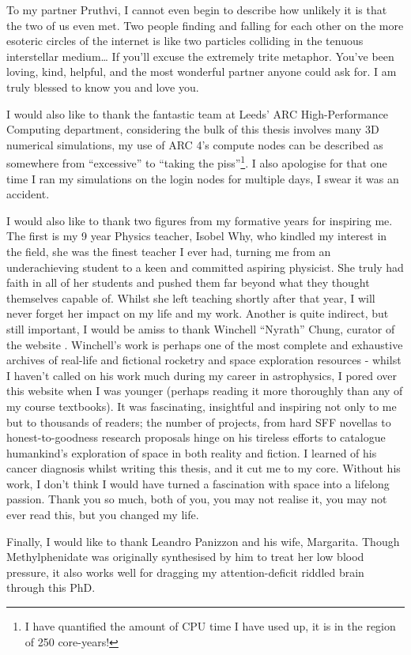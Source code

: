 \begin{acknowledgements}
To my partner Pruthvi, I cannot even begin to describe how unlikely it is that the two of us even met.
Two people finding and falling for each other on the more esoteric circles of the internet is like two particles colliding in the tenuous interstellar medium\ldots{}
If you'll excuse the extremely trite metaphor.
You've been loving, kind, helpful, and the most wonderful partner anyone could ask for.
I am truly blessed to know you and love you.

I would also like to thank the fantastic team at Leeds' ARC High-Performance Computing department, considering the bulk of this thesis involves many 3D numerical simulations, my use of ARC 4's compute nodes can be described as somewhere from ``excessive'' to ``taking the piss''\footnote{I have quantified the amount of CPU time I have used up, it is in the region of 250 core-years!}.
I also apologise for that one time I ran my simulations on the login nodes for multiple days, I swear it was an accident.

I would also like to thank two figures from my formative years for inspiring me.
The first is my 9 year Physics teacher, Isobel Why, who kindled my interest in the field, she was the finest teacher I ever had, turning me from an underachieving student to a keen and committed aspiring physicist.
She truly had faith in all of her students and pushed them far beyond what they thought themselves capable of.
Whilst she left teaching shortly after that year, I will never forget her impact on my life and my work.
Another is quite indirect, but still important, I would be amiss to thank Winchell ``Nyrath'' Chung, curator of the website .
Winchell's work is perhaps one of the most complete and exhaustive archives of real-life and fictional rocketry and space exploration resources - whilst I haven't called on his work much during my career in astrophysics, I pored over this website when I was younger (perhaps reading it more thoroughly than any of my course textbooks).
It was fascinating, insightful and inspiring not only to me but to thousands of readers; the number of projects, from hard SFF novellas to honest-to-goodness research proposals hinge on his tireless efforts to catalogue humankind's exploration of space in both reality and fiction.
I learned of his cancer diagnosis whilst writing this thesis, and it cut me to my core.
Without his work, I don't think I would have turned a fascination with space into a lifelong passion.
Thank you so much, both of you, you may not realise it, you may not ever read this, but you changed my life.

Finally, I would like to thank Leandro Panizzon and his wife, Margarita.
Though Methylphenidate was originally synthesised by him to treat her low blood pressure, it also works well for dragging my attention-deficit riddled brain through this PhD.

\end{acknowledgements}


